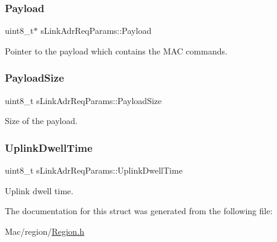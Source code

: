 \subsubsection{\texorpdfstring{Payload}{Payload}}
{\footnotesize\ttfamily uint8\+\_\+t$\ast$ s\+Link\+Adr\+Req\+Params\+::\+Payload}

Pointer to the payload which contains the M\+AC commands. \mbox{\label{structsLinkAdrReqParams_ae12d8663597aa0cf1134ac00f77238c4}} 
\subsubsection{\texorpdfstring{Payload\+Size}{PayloadSize}}
{\footnotesize\ttfamily uint8\+\_\+t s\+Link\+Adr\+Req\+Params\+::\+Payload\+Size}

Size of the payload. \mbox{\label{structsLinkAdrReqParams_a4e183e8eb34bdc875c1d746a37985ac1}} 
\subsubsection{\texorpdfstring{Uplink\+Dwell\+Time}{UplinkDwellTime}}
{\footnotesize\ttfamily uint8\+\_\+t s\+Link\+Adr\+Req\+Params\+::\+Uplink\+Dwell\+Time}

Uplink dwell time. 

The documentation for this struct was generated from the following file\+:\begin{DoxyCompactItemize}
\item 
Mac/region/\hyperlink{Region_8h}{Region.\+h}\end{DoxyCompactItemize}
